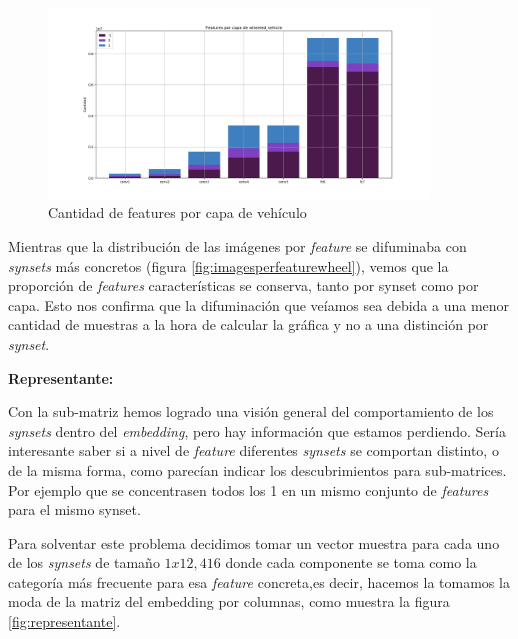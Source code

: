 \documentclass[12,twoside]{TFG-GM}
\theoremstyle{definition}
\theoremstyle{remark}
\begin{document}
\begin{figure}[ht] 
	\centering
	\includegraphics[width=0.9\textwidth] {Images/plots/25/synsetslayer/Comparative_of_synsets_wheeled_vehicle_global.png}
	\caption{ Cantidad de features por capa de vehículo
	\label{fig:featuresperlayervehicle}}
\end{figure}

Mientras que la distribución de las imágenes por \textit{feature} se difuminaba con \textit{synsets} más concretos (figura \ref{fig:imagesperfeaturewheel}), vemos que la proporción de \textit{features} características se conserva, tanto por synset como por capa. Esto nos confirma que la difuminación que veíamos sea debida a una menor cantidad de muestras a la hora de calcular la gráfica y no a una distinción por \textit{synset}. 

\textbf{Representante:}

Con la sub-matriz hemos logrado una visión general del comportamiento de los \textit{synsets} dentro del \textit{embedding}, pero hay información que estamos perdiendo. Sería interesante saber si a nivel de \textit{feature} diferentes \textit{synsets} se comportan distinto, o de la misma forma, como parecían indicar los descubrimientos para sub-matrices. Por ejemplo que se concentrasen todos los 1 en un mismo conjunto de \textit{features} para el mismo synset.

Para solventar este problema decidimos tomar un vector muestra para cada uno de los \textit{synsets} de tamaño $1x12,416$ donde cada componente se toma como la categoría más frecuente para esa \textit{feature} concreta,es decir, hacemos la tomamos la moda de la matriz del embedding por columnas, como muestra la figura \ref{fig:representante}. 
 
\end{document}
